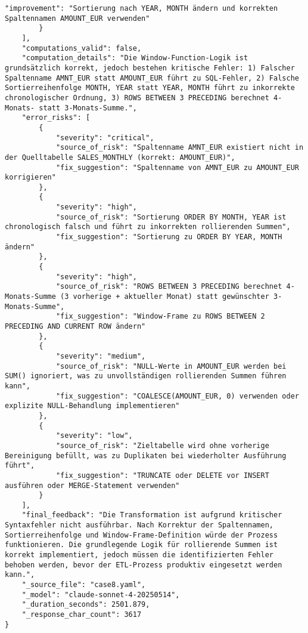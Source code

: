 \begin{lstlisting}[caption={Ausgabe: Claude Sonnet 4 Anwendungsfall 8 Robustheitsdurchlauf},label={claude_case8_prompt3}]
            "improvement": "Sortierung nach YEAR, MONTH ändern und korrekten Spaltennamen AMOUNT_EUR verwenden"
        }
    ],
    "computations_valid": false,
    "computation_details": "Die Window-Function-Logik ist grundsätzlich korrekt, jedoch bestehen kritische Fehler: 1) Falscher Spaltenname AMNT_EUR statt AMOUNT_EUR führt zu SQL-Fehler, 2) Falsche Sortierreihenfolge MONTH, YEAR statt YEAR, MONTH führt zu inkorrekte chronologischer Ordnung, 3) ROWS BETWEEN 3 PRECEDING berechnet 4-Monats- statt 3-Monats-Summe.",
    "error_risks": [
        {
            "severity": "critical",
            "source_of_risk": "Spaltenname AMNT_EUR existiert nicht in der Quelltabelle SALES_MONTHLY (korrekt: AMOUNT_EUR)",
            "fix_suggestion": "Spaltenname von AMNT_EUR zu AMOUNT_EUR korrigieren"
        },
        {
            "severity": "high",
            "source_of_risk": "Sortierung ORDER BY MONTH, YEAR ist chronologisch falsch und führt zu inkorrekten rollierenden Summen",
            "fix_suggestion": "Sortierung zu ORDER BY YEAR, MONTH ändern"
        },
        {
            "severity": "high",
            "source_of_risk": "ROWS BETWEEN 3 PRECEDING berechnet 4-Monats-Summe (3 vorherige + aktueller Monat) statt gewünschter 3-Monats-Summe",
            "fix_suggestion": "Window-Frame zu ROWS BETWEEN 2 PRECEDING AND CURRENT ROW ändern"
        },
        {
            "severity": "medium",
            "source_of_risk": "NULL-Werte in AMOUNT_EUR werden bei SUM() ignoriert, was zu unvollständigen rollierenden Summen führen kann",
            "fix_suggestion": "COALESCE(AMOUNT_EUR, 0) verwenden oder explizite NULL-Behandlung implementieren"
        },
        {
            "severity": "low",
            "source_of_risk": "Zieltabelle wird ohne vorherige Bereinigung befüllt, was zu Duplikaten bei wiederholter Ausführung führt",
            "fix_suggestion": "TRUNCATE oder DELETE vor INSERT ausführen oder MERGE-Statement verwenden"
        }
    ],
    "final_feedback": "Die Transformation ist aufgrund kritischer Syntaxfehler nicht ausführbar. Nach Korrektur der Spaltennamen, Sortierreihenfolge und Window-Frame-Definition würde der Prozess funktionieren. Die grundlegende Logik für rollierende Summen ist korrekt implementiert, jedoch müssen die identifizierten Fehler behoben werden, bevor der ETL-Prozess produktiv eingesetzt werden kann.",
    "_source_file": "case8.yaml",
    "_model": "claude-sonnet-4-20250514",
    "_duration_seconds": 2501.879,
    "_response_char_count": 3617
}
\end{lstlisting}

